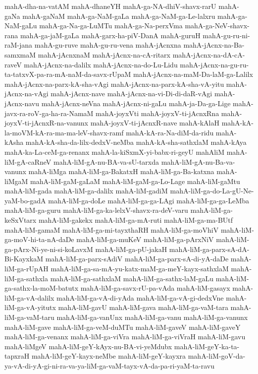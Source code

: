 {mahA-dha-na-vatAM
mahA-dhaneYH
mahA-ga-NA-dhiV-shavx-rarU
mahA-gaNa
mahA-gaNaM
mahA-ga-NaM-gaLa
mahA-ga-NaM-ga-Le-lalxru
mahA-ga-NaM-gaLu
mahA-ga-Na-ga-LuMTu
mahA-ga-Na-perxVma
mahA-ga-NeV-shavx-rana
mahA-ga-jaM-gaLa
mahA-garx-ha-piV-DanA
mahA-guruH
mahA-gu-ru-ni-raM-jana
mahA-gu-ruve
mahA-gu-ru-vena
mahA-jAcnxna
mahA-jAcnx-na-Ba-samxmaM
mahA-jAcnxnaM
mahA-jAcnx-na-cA-ritarx
mahA-jAcnx-na-dA-cA-raveV
mahA-jAcnx-na-dalilx
mahA-jAcnx-na-do-Lu-Lidu
mahA-jAcnx-na-gu-ru-ta-tatxvX-pa-ra-mA-naM-da-savx-rUpaM
mahA-jAcnx-na-maM-Da-laM-ga-Lalilx
mahA-jAcnx-na-parx-kA-sha-vAgi
mahA-jAcnx-na-parx-kA-sha-vA-yitu
mahA-jAcnx-na-vAgi
mahA-jAcnx-nave
mahA-jAcnx-na-vi-Di-di-daR-vAgi
mahA-jAcnx-navu
mahA-jAcnx-neVna
mahA-jAcnx-ni-gaLu
mahA-ja-Da-ga-Lige
mahA-javx-ra-roV-ga-ha-ra-NamaM
mahA-joyxVti
mahA-joyxV-ti-jAcnxRna
mahA-joyxV-ti-jAcnxR-na-vanunx
mahA-joyxV-ti-jAcnxR-nave
mahA-kAlaH
mahA-kA-la-moVM-kA-ra-ma-ma-leV-shavx-ramf
mahA-kA-ra-Na-diM-da-ridu
mahA-kAsha
mahA-kA-sha-da-lilx-dedxV-neMba
mahA-kA-sha-sathxlaM
mahA-kAya
mahA-ka-La-ceM-ga-renanx
mahA-la-kiSxmX-yi-babx-ri-geyU
mahAliM
mahA-liM-gA-caRneV
mahA-liM-gA-nu-BA-va-sU-tarxda
mahA-liM-gA-nu-Ba-va-vanunx
mahA-liMga
mahA-liM-ga-BakatxH
mahA-liM-ga-Ba-katxna
mahA-liMgaM
mahA-liM-gaM-gaLaM
mahA-liM-gaM-ga-Lo-Lage
mahA-liM-gaMtu
mahA-liM-gada
mahA-liM-ga-dalilx
mahA-liM-gadiM
mahA-liM-ga-do-La-gU-Ne-yaM-bo-gadA
mahA-liM-ga-doLe
mahA-liM-ga-ga-LAgi
mahA-liM-ga-ga-LeMba
mahA-liM-ga-guru
mahA-liM-ga-ka-lelxV-shavx-ra-deV-varu
mahA-liM-ga-keSxVtarx
mahA-liM-gakekx
mahA-liM-ga-mA-ruti
mahA-liM-ga-ma-BUtf
mahA-liM-gamaM
mahA-liM-ga-mi-tayxthaRH
mahA-liM-ga-moVhiV
mahA-liM-ga-moV-hi-ta-nA-daDe
mahA-liM-ga-muKeV
mahA-liM-ga-pArxNiV
mahA-liM-ga-pArx-Ni-ye-ni-si-koLavxM
mahA-liM-ga-pU-jakaH
mahA-liM-ga-parx-sA-dA-Bi-KayxkaM
mahA-liM-ga-parx-sAdiV
mahA-liM-ga-parx-sA-di-yA-daDe
mahA-liM-ga-rUpAH
mahA-liM-ga-sa-mA-yu-katx-maM-ga-meY-kayx-sathxlaM
mahA-liM-ga-sathxla
mahA-liM-ga-sathxlaM
mahA-liM-ga-sathx-laM-gaLu
mahA-liM-ga-sathx-la-moM-batutx
mahA-liM-ga-savx-rU-pa-vAda
mahA-liM-gasayx
mahA-liM-ga-vA-dalilx
mahA-liM-ga-vA-di-yAda
mahA-liM-ga-vA-gi-dedxVne
mahA-liM-ga-vA-yitutx
mahA-liM-gavU
mahA-liM-gava
mahA-liM-ga-vaM-tara
mahA-liM-ga-vaM-taru
mahA-liM-ga-vanUnx
mahA-liM-ga-vanu
mahA-liM-ga-vanunx
mahA-liM-gave
mahA-liM-ga-veM-duMTu
mahA-liM-gaveV
mahA-liM-gaveY
mahA-liM-ga-venanx
mahA-liM-ga-viVra
mahA-liM-ga-viVraH
mahA-liM-gavu
mahA-liMgeV
mahA-liM-geY-kAyx-nu-BA-vi-yeMdubx
mahA-liM-geY-ka-ta-tapxraH
mahA-liM-geY-kayx-neMbe
mahA-liM-geY-kayxra
mahA-liM-goV-da-ya-vA-di-yA-gi-ni-ra-va-ya-liM-ga-vaM-tayx-vA-da-pa-ri-yaM-ta-ravu
}
